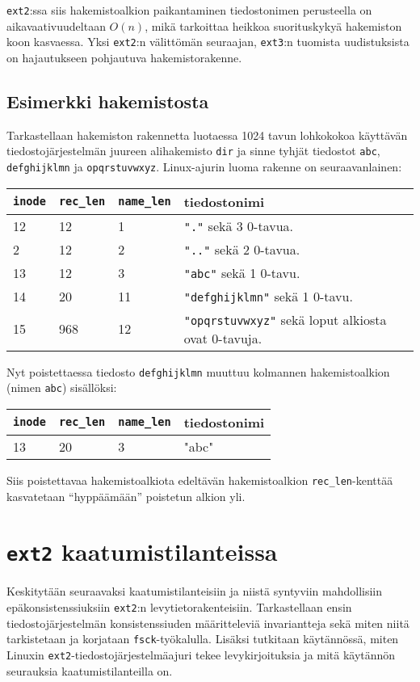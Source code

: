 \texttt{ext2}:ssa siis hakemistoalkion paikantaminen tiedostonimen perusteella on aikavaativuudeltaan $O(n)$,
mikä tarkoittaa heikkoa suorituskykyä hakemiston koon kasvaessa.
Yksi \texttt{ext2}:n välittömän seuraajan, \texttt{ext3}:n tuomista uudistuksista on hajautukseen pohjautuva hakemistorakenne.

\subsection{Esimerkki hakemistosta}
Tarkastellaan hakemiston rakennetta luotaessa 1024 tavun lohkokokoa käyttävän tiedostojärjestelmän juureen alihakemisto \texttt{dir} ja sinne tyhjät tiedostot \texttt{abc}, \texttt{defghijklmn} ja \texttt{opqrstuvwxyz}.
Linux-ajurin luoma rakenne on seuraavanlainen:

\begin{tabular}{llll}
    \texttt{inode} & \texttt{rec\_len} & \texttt{name\_len} & tiedostonimi \\ \hline
    12 & 12  & 1  & \texttt{"."}            sekä 3 0-tavua. \\
    2  & 12  & 2  & \texttt{".."}           sekä 2 0-tavua. \\
    13 & 12  & 3  & \texttt{"abc"}          sekä 1 0-tavu. \\
    14 & 20  & 11 & \texttt{"defghijklmn"}  sekä 1 0-tavu. \\
    15 & 968 & 12 & \texttt{"opqrstuvwxyz"} sekä loput alkiosta ovat 0-tavuja. \\
\end{tabular}
%
Nyt poistettaessa tiedosto \texttt{defghijklmn} muuttuu kolmannen hakemistoalkion (nimen \texttt{abc}) sisällöksi:

\begin{tabular}{llll}
    \texttt{inode} & \texttt{rec\_len} & \texttt{name\_len} & tiedostonimi \\ \hline
    13 & 20  & 3  & "abc"\\
\end{tabular}
%
Siis poistettavaa hakemistoalkiota edeltävän hakemistoalkion \texttt{rec\_len}-kenttää kasvatetaan ``hyppäämään'' poistetun alkion yli.

\section{\texttt{ext2} kaatumistilanteissa}
\label{ChapExt2Crash}
Keskitytään seuraavaksi kaatumistilanteisiin ja niistä syntyviin mahdollisiin epäkonsistenssiuksiin \texttt{ext2}:n levytietorakenteisiin.
Tarkastellaan ensin tiedostojärjestelmän konsistenssiuden määritteleviä invariantteja sekä miten niitä tarkistetaan ja korjataan \texttt{fsck}-työkalulla.
Lisäksi tutkitaan käytännössä,
miten Linuxin \texttt{ext2}-tiedostojärjestelmäajuri tekee levykirjoituksia ja mitä käytännön seurauksia kaatumistilanteilla on.

